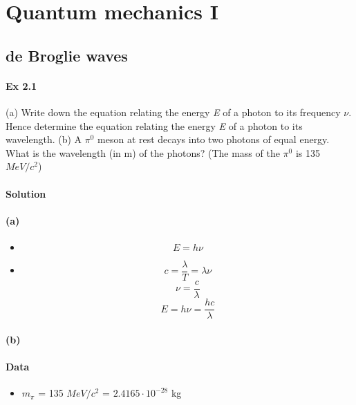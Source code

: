 \documentclass{article}
\begin{document}

\section{Quantum mechanics I}
\subsection{de Broglie waves}


\paragraph{Ex 2.1}
(a) Write down the equation relating the energy \textit{E} of a photon to its frequency
\textit{$\nu$}. Hence determine the equation relating the energy \textit{E} of a photon to its
wavelength. (b) A $\pi^0$ meson at rest decays into two photons of equal energy. What is the
wavelength (in m) of the photons? (The mass of the $\pi^0$ is 135 $M e V/c^2$)
\paragraph{Solution}

\paragraph{(a)}
\begin{itemize}
    \item {}
        \[ E = h \nu \]
    \item {}
        \[ c = \frac{\lambda}{T} = \lambda \nu \]
        \[ \nu = \frac{c}{\lambda} \]
        \[ E = h \nu  = \frac{h c}{\lambda} \]
\end{itemize}

\paragraph{(b)}
\paragraph{Data}
\begin{itemize}
    \item $m_\pi$ = 135 $M e V/c^2$ = $2.4165 \cdot 10^{-28}$ kg
\end{itemize}
\end{document}
